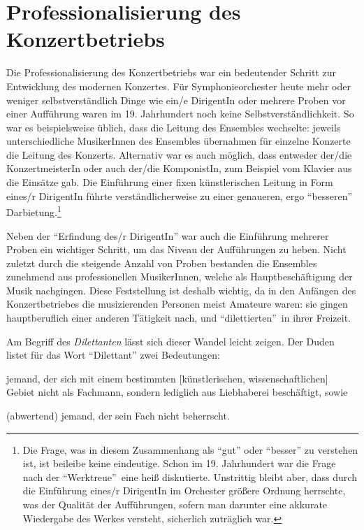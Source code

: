 \documentclass[a4paper, german, oneside]{scrbook}
\begin{document}
\section{Professionalisierung des Konzertbetriebs}
\label{professionalisierung}
Die Professionalisierung des Konzertbetriebs war ein bedeutender Schritt zur Entwicklung des modernen Konzertes. Für Symphonieorchester heute mehr oder weniger selbstverständlich Dinge wie ein/e DirigentIn oder mehrere Proben vor einer Aufführung waren im 19. Jahrhundert noch keine Selbstverständlichkeit. So war es beispielsweise üblich, dass die Leitung des Ensembles wechselte: jeweils unterschiedliche MusikerInnen des Ensembles übernahmen für einzelne Konzerte die Leitung des Konzerts. \parencite[vgl.][68]{weber_music_2004} Alternativ war es auch möglich, dass entweder der/die KonzertmeisterIn oder auch der/die KomponistIn, zum Beispiel vom Klavier aus die Einsätze gab. Die Einführung einer fixen künstlerischen Leitung in Form eines/r DirigentIn führte verständlicherweise zu einer genaueren, ergo \enquote{besseren} Darbietung.\footnote{Die Frage, was in diesem Zusammenhang als \enquote{gut} oder \enquote{besser} zu verstehen ist, ist beileibe keine eindeutige. Schon im 19. Jahrhundert war die Frage nach der \enquote{Werktreue} eine heiß diskutierte. Unstrittig bleibt aber, dass durch die Einführung eines/r DirigentIn im Orchester größere Ordnung herrschte, was der Qualität der Aufführungen, sofern man darunter eine akkurate Wiedergabe des Werkes versteht, sicherlich zuträglich war.}

Neben der \enquote{Erfindung des/r DirigentIn} war auch die Einführung mehrerer Proben ein wichtiger Schritt, um das Niveau der Aufführungen zu heben. Nicht zuletzt durch die steigende Anzahl von Proben bestanden die Ensembles zunehmend aus professionellen MusikerInnen, welche als Hauptbeschäftigung der Musik nachgingen. Diese Feststellung ist deshalb wichtig, da in den Anfängen des Konzertbetriebes die musizierenden Personen meist Amateure waren: sie gingen hauptberuflich einer anderen Tätigkeit nach, und \enquote{dilettierten} in ihrer Freizeit.

Am Begriff des \emph{Dilettanten} lässt sich dieser Wandel leicht zeigen. Der Duden listet für das Wort \enquote{Dilettant} zwei Bedeutungen:
\begin{inparaenum}[(a)]
	\item jemand, der sich mit einem bestimmten [künstlerischen, wissenschaftlichen] Gebiet nicht als Fachmann, sondern lediglich aus Liebhaberei beschäftigt, sowie
	\item (abwertend) jemand, der sein Fach nicht beherrscht.
\end{inparaenum}
\parencite{Dilettant}
\end{document}
